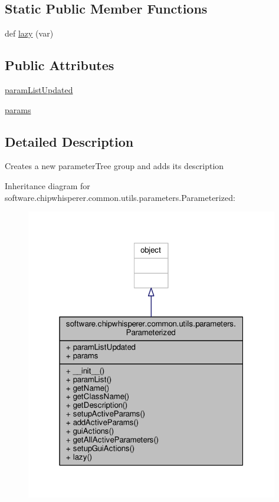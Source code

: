 \subsection*{Static Public Member Functions}
\begin{DoxyCompactItemize}
\item 
def \hyperlink{classsoftware_1_1chipwhisperer_1_1common_1_1utils_1_1parameters_1_1Parameterized_ab933f28c7e3cfa0819df8df87b7b0dba}{lazy} (var)
\end{DoxyCompactItemize}
\subsection*{Public Attributes}
\begin{DoxyCompactItemize}
\item 
\hyperlink{classsoftware_1_1chipwhisperer_1_1common_1_1utils_1_1parameters_1_1Parameterized_acf38aa3f6634073f4162fba0abf0501c}{param\+List\+Updated}
\item 
\hyperlink{classsoftware_1_1chipwhisperer_1_1common_1_1utils_1_1parameters_1_1Parameterized_a4e79c2f229cc9b366e4d4aa2f584c990}{params}
\end{DoxyCompactItemize}


\subsection{Detailed Description}
\begin{DoxyVerb}Creates a new parameterTree group and adds its description
\end{DoxyVerb}
 

Inheritance diagram for software.\+chipwhisperer.\+common.\+utils.\+parameters.\+Parameterized\+:\nopagebreak
\begin{figure}[H]
\begin{center}
\leavevmode
\includegraphics[width=313pt]{d9/d51/classsoftware_1_1chipwhisperer_1_1common_1_1utils_1_1parameters_1_1Parameterized__inherit__graph}
\end{center}
\end{figure}


